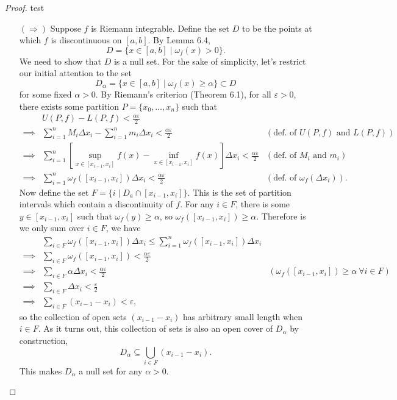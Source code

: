 \documentclass{article}
\theoremstyle{definition}
\begin{document}
	\begin{proof}
		{\color{white}test}
		\begin{enumerate}
			\item [$ (\Longrightarrow) $] Suppose $ f $ is Riemann integrable. Define the set $ D $ to be the points at which $ f $ is discontinuous on $ [a,b] $. By Lemma 6.4,
			$$ D=\{x\in[a,b] \mid \omega_f(x)>0\}. $$
			We need to show that $ D $ is a null set. For the sake of simplicity, let's restrict our initial attention to the set $$ D_\alpha =  \{x\in[a,b] \mid \omega_f(x)\ge \alpha\}\subset D$$ for some fixed $ \alpha > 0 $. By Riemann's criterion (Theorem 6.1), for all $ \varepsilon>0 $, there exists some partition $ P=\{x_0,\ldots, x_n\} $ such that 
			\begin{align*}
				&U(P,f)-L(P,f)<\frac{\alpha\varepsilon}{2}\\
				\implies & \sum_{i=1}^{n}M_i\Delta x_i - \sum_{i=1}^{n}m_i\Delta x_i <\frac{\alpha\varepsilon}{2}& (\text{def. of }U(P,f)\text{ and }L(P,f))\\
				\implies & \sum_{i=1}^{n}\left[\sup_{x\in[x_{i-1}, x_i]}f(x) - \inf_{x\in[x_{i-1}, x_i]}f(x)\right]\Delta x_i <\frac{\alpha\varepsilon}{2}& (\text{def. of }M_i\text{ and }m_i)\\
				\implies & \sum_{i=1}^{n}\omega_f([x_{i-1}, x_i])\Delta x_i <\frac{\alpha\varepsilon}{2}& (\text{def. of }\omega_f(\Delta x_i)).
			\end{align*}
			Now define the set $ F = \{i \mid D_a\cap [x_{i-1}, x_i]\}$. This is the set of partition intervals which contain a discontinuity of $ f $. For any $ i\in F $, there is some $ y\in[x_{i-1}, x_i] $ such that $ \omega_f(y)\ge \alpha $, so $ \omega_f([x_{i-1}, x_i]) \ge \alpha $.  Therefore is we only sum over $ i\in F $, we have 
			\begin{align*}
				&\sum_{i\in F}\omega_f([x_{i-1}, x_i])\Delta x_i \le \sum_{i=1}^{n}\omega_f([x_{i-1}, x_i])\Delta x_i\\
				\implies & \sum_{i\in F}\omega_f([x_{i-1}, x_i])<\frac{\alpha\varepsilon}{2}\\
				\implies & \sum_{i\in F}\alpha \Delta x_i <  \frac{\alpha\varepsilon}{2} & (\omega_f([x_{i-1}, x_i]) \ge \alpha\ \forall i \in F)\\
				\implies & \sum_{i\in F} \Delta x_i < \frac{\varepsilon}{2}\\
				\implies & \sum_{i\in F}  (x_{i-1}- x_i)< \varepsilon,
			\end{align*}
			so the collection of open sets $ (x_{i-1}-x_i) $ has arbitrary small length when $ i\in F $. As it turns out, this collection of sets is also an open cover of $ D_\alpha $ by construction, $$ D_\alpha \subseteq \bigcup_{i\in F}(x_{i-1}- x_i).$$ This makes $ D_\alpha $ a null set for any $ \alpha > 0 $.
			

\end{enumerate}
\end{proof}
\end{document}
